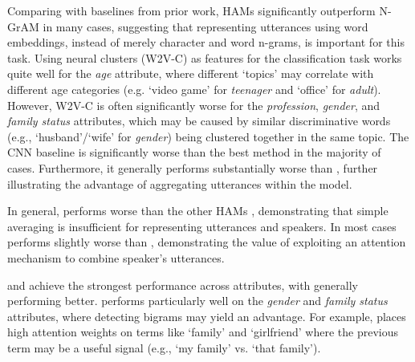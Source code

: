 Comparing with baselines from prior work, HAMs significantly outperform N-GrAM \cite{basile:2017} in many cases,
suggesting that representing utterances using word embeddings, instead of merely character and word n-grams, is important for this task. 
Using neural clusters (W2V-C) as features for the classification task \cite{pietro:ACL15} works quite well for the \textit{age} attribute, where different `topics' may correlate with different age categories (e.g. `video game' for \textit{teenager} and `office' for \textit{adult}).
However, W2V-C is often significantly worse for the \textit{profession}, \textit{gender}, and \textit{family status} attributes, which may be caused by similar discriminative words (e.g., `husband'/`wife' for \textit{gender}) being clustered together in the same topic.
The CNN baseline \cite{bayot:MOD17} is significantly worse than the best method in the majority of cases. Furthermore, it generally performs substantially worse than , further illustrating the advantage of aggregating utterances within the model.

In general,  performs worse than the other HAMs%
, demonstrating that simple averaging is insufficient
for representing utterances and speakers.
In most cases  performs slightly worse than , demonstrating
the value of exploiting an attention mechanism to combine speaker's utterances.

 and   
achieve the strongest performance across attributes, with  generally performing better.
 performs particularly well on the \textit{gender} and \textit{family status} attributes, where detecting bigrams may yield an advantage. For example,  places high attention weights on terms like `family' and `girlfriend' where the previous term may be a useful signal (e.g., `my family' vs. `that family').

